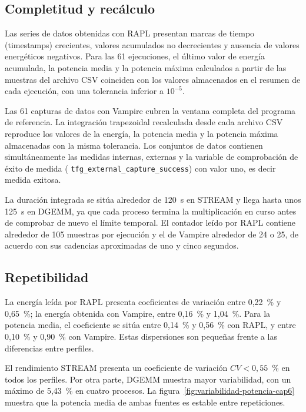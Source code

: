 \begin{table}[htbp]
    \centering
    \caption{Comprobaciones de integridad de la campaña definitiva.}
    \label{tab:validacion-cap6}
    
\end{table}

\subsection{Completitud y recálculo}

Las series de datos obtenidas con RAPL presentan marcas de tiempo (timestamps) crecientes, valores acumulados no decrecientes y ausencia de valores energéticos negativos. Para las 61 ejecuciones, el último valor de energía acumulada, la potencia media y la potencia máxima calculados a partir de las muestras del archivo CSV coinciden con los valores almacenados en el resumen de cada ejecución, con una tolerancia inferior a \(10^{-5}\).

Las 61 capturas de datos con Vampire cubren la ventana completa del programa de referencia. La integración trapezoidal recalculada desde cada archivo CSV reproduce los valores de la energía, la potencia media y la potencia máxima almacenadas con la misma tolerancia. Los conjuntos de datos contienen simultáneamente las medidas internas, externas y la variable de comprobación de éxito de medida ( \texttt{tfg\_external\_capture\_success}) con valor uno, es decir medida exitosa.

La duración integrada se sitúa alrededor de 120~s en STREAM y llega hasta unos 125~s en DGEMM, ya que cada proceso termina la multiplicación en curso antes de comprobar de nuevo el límite temporal. El contador leído por RAPL contiene alrededor de 105 muestras por ejecución y el de Vampire alrededor de 24 o 25, de acuerdo con sus cadencias aproximadas de uno y cinco segundos.

\subsection{Repetibilidad}

La energía leída por RAPL presenta coeficientes de variación entre 0,22~\% y 0,65~\%; la energía obtenida con Vampire, entre 0,16~\% y 1,04~\%. Para la potencia media, el coeficiente se sitúa entre 0,14~\% y 0,56~\% con RAPL, y entre 0,10~\% y 0,90~\% con Vampire. Estas dispersiones son pequeñas frente a las diferencias entre perfiles.

El rendimiento STREAM presenta un coeficiente de variación $CV<0{,}55$~\% en todos los perfiles. Por otra parte, DGEMM muestra mayor variabilidad, con un máximo de 5,43~\% en cuatro procesos. La figura~\ref{fig:variabilidad-potencia-cap6} muestra que la potencia media de ambas fuentes es estable entre repeticiones.

